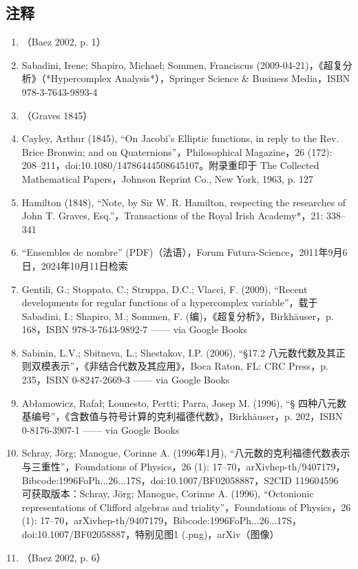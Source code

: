 \subsection{注释}
\begin{enumerate}
\item （Baez 2002, p. 1）
\item Sabadini, Irene; Shapiro, Michael; Sommen, Franciscus (2009-04-21)，《超复分析》（*Hypercomplex Analysis*），Springer Science & Business Media，ISBN 978-3-7643-9893-4
\item （Graves 1845）
\item Cayley, Arthur (1845), “On Jacobi's Elliptic functions, in reply to the Rev. Brice Bronwin; and on Quaternions”，Philosophical Magazine，26 (172): 208–211，doi:10.1080/14786444508645107。附录重印于 The Collected Mathematical Papers，Johnson Reprint Co., New York, 1963, p. 127
\item Hamilton (1848), “Note, by Sir W. R. Hamilton, respecting the researches of John T. Graves, Esq.”，Transactions of the Royal Irish Academy*，21: 338–341
\item “Ensembles de nombre” (PDF)（法语），Forum Futura-Science，2011年9月6日，2024年10月11日检索
\item Gentili, G.; Stoppato, C.; Struppa, D.C.; Vlacci, F. (2009), “Recent developments for regular functions of a hypercomplex variable”，载于 Sabadini, I.; Shapiro, M.; Sommen, F. (编)，《超复分析》，Birkhäuser，p. 168，ISBN 978-3-7643-9892-7 —— via Google Books
\item Sabinin, L.V.; Sbitneva, L.; Shestakov, I.P. (2006), “§17.2 八元数代数及其正则双模表示”，《非结合代数及其应用》，Boca Raton, FL: CRC Press，p. 235，ISBN 0-8247-2669-3 —— via Google Books
\item Abłamowicz, Rafał; Lounesto, Pertti; Parra, Josep M. (1996), “§ 四种八元数基编号”，《含数值与符号计算的克利福德代数》，Birkhäuser，p. 202，ISBN 0-8176-3907-1 —— via Google Books
\item Schray, Jörg; Manogue, Corinne A. (1996年1月), “八元数的克利福德代数表示与三重性”，Foundations of Physics，26 (1): 17–70，arXiv\:hep-th/9407179，Bibcode:1996FoPh...26...17S，doi:10.1007/BF02058887，S2CID 119604596\\
可获取版本：Schray, Jörg; Manogue, Corinne A. (1996), “Octonionic representations of Clifford algebras and triality”，Foundations of Physics，26 (1): 17–70，arXiv\:hep-th/9407179，Bibcode:1996FoPh...26...17S，doi:10.1007/BF02058887，特别见图1 (.png)，arXiv（图像）
\item （Baez 2002, p. 6）

\end{enumerate}
